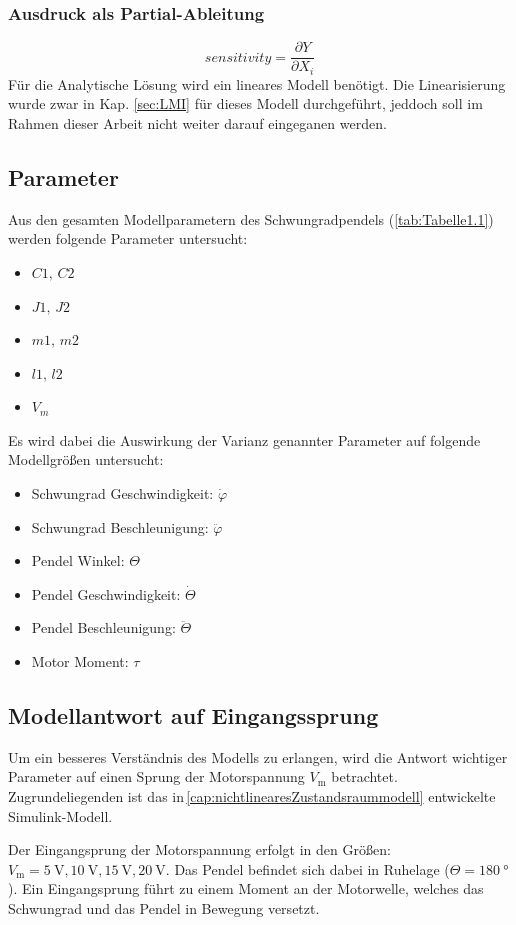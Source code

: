 \subsubsection*{Ausdruck als Partial-Ableitung}
\begin{equation}
    sensitivity=\frac{\partial Y}{\partial X_i}
\end{equation}
Für die Analytische Lösung wird ein lineares Modell benötigt. Die Linearisierung wurde zwar in Kap. \ref{sec:LMI} für dieses Modell durchgeführt, jeddoch soll im Rahmen dieser Arbeit nicht weiter darauf eingeganen werden.

\subsection{Parameter}
Aus den gesamten Modellparametern des Schwungradpendels (\ref{tab:Tabelle1.1}) werden folgende Parameter untersucht:
\begin{itemize}
    \item $C1,\, C2$
    \item $J1,\, J2$
    \item $m1,\, m2$
    \item $l1,\, l2$
    \item $V_m$
\end{itemize}
Es wird dabei die Auswirkung der Varianz genannter Parameter auf folgende Modellgrößen untersucht:
\begin{itemize}
    \item Schwungrad Geschwindigkeit: $\dot\varphi$
    \item Schwungrad Beschleunigung: $\ddot\varphi$
    \item Pendel Winkel: $\Theta$
    \item Pendel Geschwindigkeit: $\dot\Theta$
    \item Pendel Beschleunigung: $\ddot\Theta$
    \item Motor Moment: $\tau$
\end{itemize}
\subsection*{Modellantwort auf Eingangssprung}

Um ein besseres Verständnis des Modells zu erlangen, wird die Antwort wichtiger Parameter auf einen Sprung der Motorspannung $V_{\mathrm{m}}$ betrachtet.
Zugrundeliegenden ist das in\,\ref{cap:nichtlinearesZustandsraummodell} entwickelte Simulink-Modell.

Der Eingangsprung der Motorspannung erfolgt in den Größen: $V_{\mathrm{m}}=\SI{5}{\volt},\SI{10}{\volt},\SI{15}{\volt},\SI{20}{\volt}$.
Das Pendel befindet sich dabei in Ruhelage ($\Theta=\SI{180}{\degree}$). 
Ein Eingangsprung führt zu einem Moment an der Motorwelle, welches das Schwungrad und das Pendel in Bewegung versetzt.\\

